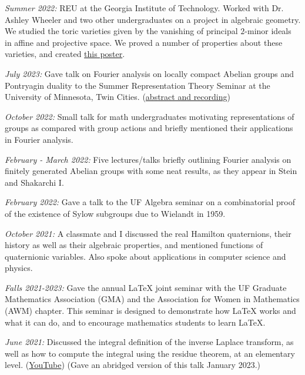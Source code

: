 \documentclass[11pt]{article}
\begin{document}
\textsl{Summer 2022:} REU at the Georgia Institute of Technology. Worked with Dr. Ashley Wheeler and two other undergraduates on a project in algebraic geometry. We studied the toric varieties given by the vanishing of principal $2$-minor ideals in affine and projective space. We proved a number of properties about these varieties, and created {\color{blue}\href{https://math.gatech.edu/sites/default/files/images/boniface-rodriguez-sivakumar-wheeler.pdf}{this poster}}.


\textsl{July 2023:} Gave talk on Fourier analysis on locally compact Abelian groups and Pontryagin duality to the Summer Representation Theory Seminar at the University of Minnesota, Twin Cities. ({\color{blue}\href{https://sites.google.com/umn.edu/robertangarone/ssrts-23}{abstract and recording}})

\textsl{October 2022:} Small talk for math undergraduates motivating representations of groups as compared with group actions and briefly mentioned their applications in Fourier analysis. 

\textsl{February - March 2022:} Five lectures/talks briefly outlining Fourier analysis on finitely generated Abelian groups with some neat results, as they appear in Stein and Shakarchi I. 

\textsl{February 2022:} Gave a talk to the UF Algebra seminar on a combinatorial proof of the existence of Sylow subgroups due to Wielandt in 1959.

\textsl{October 2021:} A classmate and I discussed the real Hamilton quaternions, their history as well as their algebraic properties, and mentioned functions of quaternionic variables. Also spoke about applications in computer science and physics.

\textsl{Falls 2021-2023:} Gave the annual \LaTeX\hspace{1pt} joint seminar with the UF Graduate Mathematics Association (GMA) and the Association for Women in Mathematics (AWM) chapter. This seminar is designed to demonstrate how \LaTeX\hspace{1pt} works and what it can do, and to encourage mathematics students to learn \LaTeX\hspace{1pt}.

\textsl{June 2021:} Discussed the integral definition of the inverse Laplace transform, as well as how to compute the integral using the residue theorem, at an elementary level. ({\color{blue}\href{https://youtu.be/20Xbrit2chw}{YouTube}}) (Gave an abridged version of this talk January 2023.)
\end{document}
